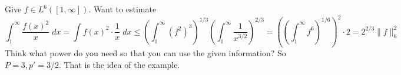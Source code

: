 \begin{ex}
Give $f \in L^6([1,\infty])$. Want to estimate
	\[
	\int_1^\infty \dfrac{f(x)^2}{x} \; dx = \int f(x)^2 \cdot \dfrac{1}{x} \; dx  \leq \left(\int_1^\infty (f^2)^3 \right)^{1/3} \left( \int_1^\infty \dfrac{1}{x^{3/2}} \right)^{2/3}= \left(\left(\int_1^\infty f^6 \right)^{1/6} \right)^2 \cdot 2= 2^{2/3} \|f\|_6^2
	\]
Think what power do you need so that you can use the given information? So $P=3, p'= 3/2$. That is the idea of the example. 
\end{ex}












































